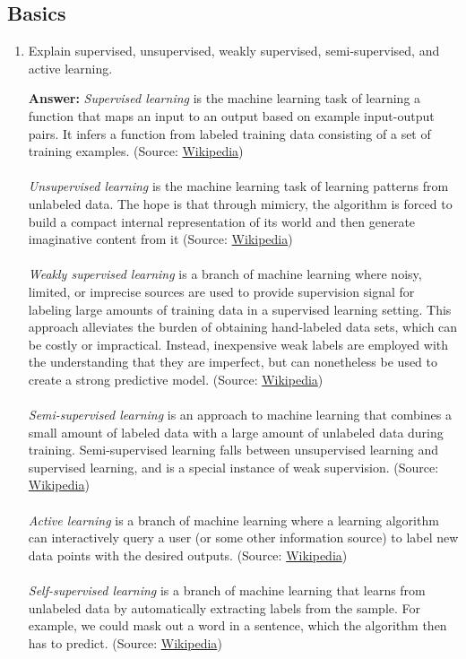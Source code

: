 \documentclass{article}
\newenvironment{QandA}{\begin{enumerate}[label=\arabic*.]}{\end{enumerate}}
\newenvironment{answer}{\par\normalfont \textbf{Answer:}}{}
\begin{document}
\subsection{Basics}
\begin{QandA}
    \item Explain supervised, unsupervised, weakly supervised, semi-supervised, and active learning.
    \begin{answer}
        \textit{Supervised learning} is the machine learning task of learning a function that maps an input to an output based on example input-output pairs. It infers a function from labeled training data consisting of a set of training examples. (Source: \href{https://en.wikipedia.org/wiki/Supervised_learning}{Wikipedia}) \\\\
        \textit{Unsupervised learning} is the machine learning task of learning patterns from unlabeled data. The hope is that through mimicry, the algorithm is forced to build a compact internal representation of its world and then generate imaginative content from it (Source: \href{https://en.wikipedia.org/wiki/Unsupervised_learning}{Wikipedia}) \\\\
        \textit{Weakly supervised learning} is a branch of machine learning where noisy, limited, or imprecise sources are used to provide supervision signal for labeling large amounts of training data in a supervised learning setting. This approach alleviates the burden of obtaining hand-labeled data sets, which can be costly or impractical. Instead, inexpensive weak labels are employed with the understanding that they are imperfect, but can nonetheless be used to create a strong predictive model. (Source: \href{https://en.wikipedia.org/wiki/Weak_supervision}{Wikipedia}) \\\\
        \textit{Semi-supervised learning} is an approach to machine learning that combines a small amount of labeled data with a large amount of unlabeled data during training. Semi-supervised learning falls between unsupervised learning and supervised learning, and is a special instance of weak supervision. (Source: \href{https://en.wikipedia.org/wiki/Semi-supervised_learning}{Wikipedia}) \\\\
        \textit{Active learning} is a branch of machine learning where a learning algorithm can interactively query a user (or some other information source) to label new data points with the desired outputs. (Source: \href{https://en.wikipedia.org/wiki/Active_learning}{Wikipedia}) \\\\
        \textit{Self-supervised learning} is a branch of machine learning that learns from unlabeled data by automatically extracting labels from the sample. For example, we could mask out a word in a sentence, which the algorithm then has to predict. (Source: \href{https://en.wikipedia.org/wiki/Self-supervised_learning}{Wikipedia})
    \end{answer}


\end{QandA}
\end{document}
